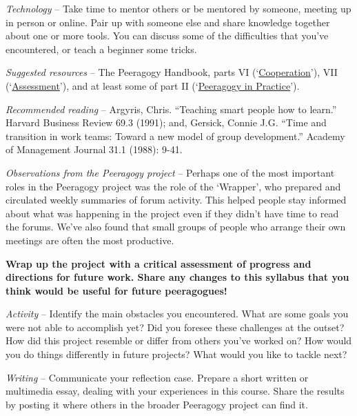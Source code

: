 \emph{Technology} -- Take time to mentor others or be mentored by
someone, meeting up in person or online. Pair up with someone else and
share knowledge together about one or more tools. You can discuss some
of the difficulties that you've encountered, or teach a beginner some
tricks.

\emph{Suggested resources} -- The Peeragogy Handbook, parts VI
(`\href{http://peeragogy.org/co-facilitation/}{Cooperation}'), VII
(`\href{http://peeragogy.org/assessment/}{Assessment}'), and at least some of part II
(`\href{http://peeragogy.org/patterns-usecases/}{Peeragogy in Practice}').

\emph{Recommended reading} -- Argyris, Chris. ``Teaching smart people
how to learn.'' Harvard Business Review 69.3 (1991); and, Gersick,
Connie J.G. ``Time and transition in work teams: Toward a new model of
group development.'' Academy of Management Journal 31.1 (1988): 9-41.

\emph{Observations from the Peeragogy project} -- Perhaps one of the
most important roles in the Peeragogy project was the role of the
`Wrapper', who prepared and circulated weekly summaries of forum
activity. This helped people stay informed about what was happening in
the project even if they didn't have time to read the forums. We've also
found that small groups of people who arrange their own meetings are
often the most productive.

\noindent{}

\textbf{Wrap up the project with a critical assessment of progress and
directions for future work. Share any changes to this syllabus that you
think would be useful for future peeragogues!}

\emph{Activity} -- Identify the main obstacles you encountered. What are
some goals you were not able to accomplish yet? Did you foresee these
challenges at the outset? How did this project resemble or differ from
others you've worked on? How would you do things differently in future
projects? What would you like to tackle next?

\emph{Writing} -- Communicate your reflection case. Prepare a short
written or multimedia essay, dealing with your experiences in this
course. Share the results by posting it where others in the broader
Peeragogy project can find it.

